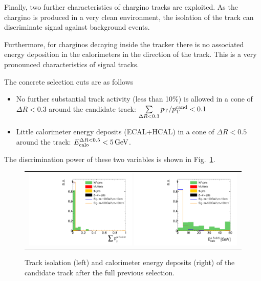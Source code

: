 Finally, two further characteristics of chargino tracks are exploited.
As the chargino is produced in a very clean environment, the isolation of the track can discriminate signal against background events.

Furthermore, for charginos decaying inside the tracker there is no associated energy deposition in the calorimeters in the direction of the track.
This is a very pronounced characteristics of signal tracks.

The concrete selection cuts are as follows
\begin{itemize}
\renewcommand{\labelitemi}{\footnotesize{\ding{118}}}
\item No further substantial track activity (less than 10\%) is allowed in a cone of $\Delta R < 0.3$ around the candidate track: \mbox{$\sum \limits_{\Delta R < 0.3} p_{\text{T}}/p_{\text{T}}^{\text{cand}} < 0.1$}
\item Little calorimeter energy deposits (ECAL+HCAL) in a cone of $\Delta R < 0.5$ around the track: \mbox{$E^{\Delta R<0.5}_{\text{calo}}<5\,\text{Ge}\kern-0.06667em\text{V}$}.
\end{itemize}
The discrimination power of these two variables is shown in Fig.~\ref{fig:TrackIso_Ecalo_After_Preselection}.\\
\begin{figure}[!b]
  \centering 
  \begin{tabular}{c}
    \includegraphics[width=0.49\textwidth]{figures/analysis/AnalysisSelection/chiTracksCandidateSelectionTrigger_2Signals_FullBkg/htrackIsolationSmallRange_lin.pdf}
    \includegraphics[width=0.49\textwidth]{figures/analysis/AnalysisSelection/chiTracksCandidateSelectionTrigger_2Signals_FullBkg/htrackCaloIsolation_lin.pdf}
  \end{tabular}
  \caption{Track isolation (left) and calorimeter energy deposits (right) of the candidate track after the full previous selection.}
  \label{fig:TrackIso_Ecalo_After_Preselection}
\end{figure}

